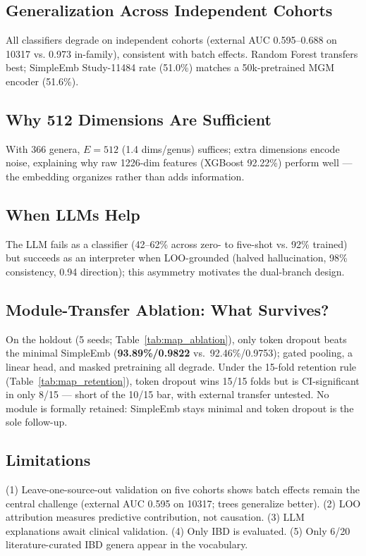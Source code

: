 \documentclass{article} %
\begin{document}
\subsection{Generalization Across Independent Cohorts}

All classifiers degrade on independent cohorts (external AUC 0.595--0.688 on 10317 vs. 0.973 in-family), consistent with batch effects. Random Forest transfers best; SimpleEmb Study-11484 rate (51.0\%) matches a 50k-pretrained MGM encoder (51.6\%).

\subsection{Why 512 Dimensions Are Sufficient}

With 366 genera, $E{=}512$ (1.4 dims/genus) suffices; extra dimensions encode noise, explaining why raw 1226-dim features (XGBoost 92.22\%) perform well --- the embedding organizes rather than adds information.

\subsection{When LLMs Help}

The LLM fails as a classifier (42--62\% across zero- to five-shot vs. 92\% trained) but succeeds as an interpreter when LOO-grounded (halved hallucination, 98\% consistency, 0.94 direction); this asymmetry motivates the dual-branch design.

\subsection{Module-Transfer Ablation: What Survives?}

On the holdout (5 seeds; Table~\ref{tab:map_ablation}), only token dropout beats the minimal SimpleEmb (\textbf{93.89\%/0.9822} vs.\ 92.46\%/0.9753); gated pooling, a linear head, and masked pretraining all degrade. Under the 15-fold retention rule (Table~\ref{tab:map_retention}), token dropout wins 15/15 folds but is CI-significant in only 8/15 --- short of the 10/15 bar, with external transfer untested. No module is formally retained: SimpleEmb stays minimal and token dropout is the sole follow-up.

\subsection{Limitations}

(1) Leave-one-source-out validation on five cohorts shows batch effects remain the central challenge (external AUC 0.595 on 10317; trees generalize better). (2) LOO attribution measures predictive contribution, not causation. (3) LLM explanations await clinical validation. (4) Only IBD is evaluated. (5) Only 6/20 literature-curated IBD genera appear in the vocabulary.
\end{document}
